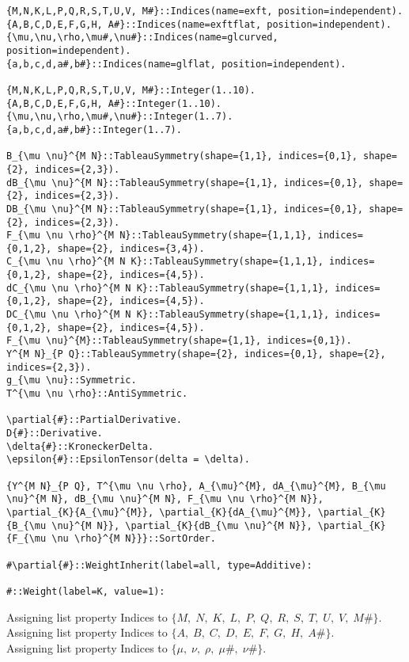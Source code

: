 \documentclass[11pt]{article}
\begin{document}
{\color[named]{Blue}\begin{verbatim}
{M,N,K,L,P,Q,R,S,T,U,V, M#}::Indices(name=exft, position=independent).
{A,B,C,D,E,F,G,H, A#}::Indices(name=exftflat, position=independent).
{\mu,\nu,\rho,\mu#,\nu#}::Indices(name=glcurved, position=independent).
{a,b,c,d,a#,b#}::Indices(name=glflat, position=independent).

{M,N,K,L,P,Q,R,S,T,U,V, M#}::Integer(1..10).
{A,B,C,D,E,F,G,H, A#}::Integer(1..10).
{\mu,\nu,\rho,\mu#,\nu#}::Integer(1..7).
{a,b,c,d,a#,b#}::Integer(1..7).

B_{\mu \nu}^{M N}::TableauSymmetry(shape={1,1}, indices={0,1}, shape={2}, indices={2,3}).
dB_{\mu \nu}^{M N}::TableauSymmetry(shape={1,1}, indices={0,1}, shape={2}, indices={2,3}).
DB_{\mu \nu}^{M N}::TableauSymmetry(shape={1,1}, indices={0,1}, shape={2}, indices={2,3}).
F_{\mu \nu \rho}^{M N}::TableauSymmetry(shape={1,1,1}, indices={0,1,2}, shape={2}, indices={3,4}).
C_{\mu \nu \rho}^{M N K}::TableauSymmetry(shape={1,1,1}, indices={0,1,2}, shape={2}, indices={4,5}).
dC_{\mu \nu \rho}^{M N K}::TableauSymmetry(shape={1,1,1}, indices={0,1,2}, shape={2}, indices={4,5}).
DC_{\mu \nu \rho}^{M N K}::TableauSymmetry(shape={1,1,1}, indices={0,1,2}, shape={2}, indices={4,5}).
F_{\mu \nu}^{M}::TableauSymmetry(shape={1,1}, indices={0,1}).
Y^{M N}_{P Q}::TableauSymmetry(shape={2}, indices={0,1}, shape={2}, indices={2,3}).
g_{\mu \nu}::Symmetric.
T^{\mu \nu \rho}::AntiSymmetric.

\partial{#}::PartialDerivative.
D{#}::Derivative.
\delta{#}::KroneckerDelta.
\epsilon{#}::EpsilonTensor(delta = \delta).

{Y^{M N}_{P Q}, T^{\mu \nu \rho}, A_{\mu}^{M}, dA_{\mu}^{M}, B_{\mu \nu}^{M N}, dB_{\mu \nu}^{M N}, F_{\mu \nu \rho}^{M N}},
\partial_{K}{A_{\mu}^{M}}, \partial_{K}{dA_{\mu}^{M}}, \partial_{K}{B_{\mu \nu}^{M N}}, \partial_{K}{dB_{\mu \nu}^{M N}}, \partial_{K}{F_{\mu \nu \rho}^{M N}}}::SortOrder.

#\partial{#}::WeightInherit(label=all, type=Additive):

#::Weight(label=K, value=1):
\end{verbatim}}
Assigning list property Indices to $\{M,\; N,\; K,\; L,\; P,\; Q,\; R,\; S,\; T,\; U,\; V,\; M\#\}$.
\\
Assigning list property Indices to $\{A,\; B,\; C,\; D,\; E,\; F,\; G,\; H,\; A\#\}$.
\\
Assigning list property Indices to $\{\mu,\; \nu,\; \rho,\; \mu\#,\; \nu\#\}$.
\end{document}

